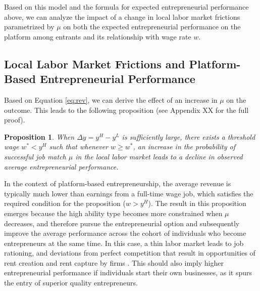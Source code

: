 \documentclass[letterpaper,12pt]{article}
\newtheorem{proposition}{Proposition}
\begin{document}
Based on this model and the formula for expected entrepreneurial performance above, we can analyze the impact of a change in local labor market frictions parametrized by $\mu$ on both the expected entrepreneurial performance on the platform among entrants and its relationship with wage rate $w$.

\subsection{Local Labor Market Frictions and Platform-Based Entrepreneurial Performance}

Based on Equation \ref{eq:rev}, we can derive the effect of an increase in $\mu$ on the outcome. This leads to the following proposition (see Appendix XX for the full proof).


\begin{proposition} \label{prop:h1}
When $\Delta y=y^{H}-y^{L}$ is sufficiently large, there exists a threshold wage $w^{*}<y^{H}$ such that whenever $w\geq w^{*}$, an increase in the probability of successful job match $\mu$ in the local labor market leads to a decline in observed average entrepreneurial performance.
\end{proposition}

In the context of platform-based entrepreneurship, the average revenue is typically much lower than earnings from a full-time wage job, which satisfies the required condition for the proposition ($w>y^{H}$). The result in this proposition emerges because the high ability type becomes more constrained when $\mu$ decreases, and therefore pursue the entrepreneurial option and subsequently improve the average performance across the cohort of individuals who become entrepreneurs at the same time. In this case, a thin labor market leads to job rationing, and deviations from perfect competition that result in opportunities of rent creation and rent capture by firms \citep{mahoney_market_2013,campbell_bridging_2017}. This should also imply higher entrepreneurial performance if individuals start their own businesses, as it spurs the entry of superior quality entrepreneurs. 
\end{document}
